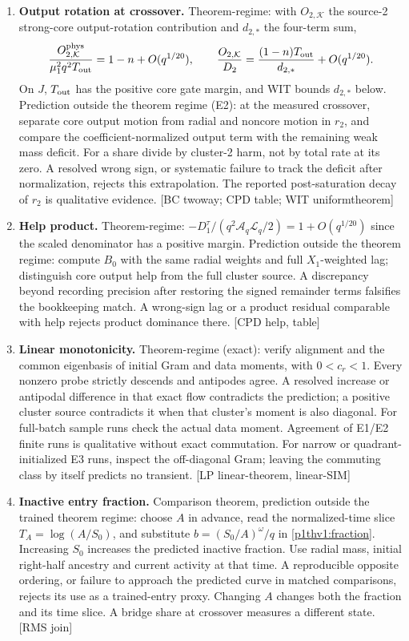 \documentclass[10pt,twocolumn]{article}
\newcommand{\src}[1]{\textnormal{\small [#1]}}
\begin{document}
\begin{enumerate}
\item \textbf{Output rotation at crossover.}
Theorem-regime: with \(O_{2,\mathcal K}\) the source-2 strong-core
output-rotation contribution and \(d_{2,*}\) the four-term sum,
\[
 \frac{O_{2,\mathcal K}^{\rm phys}}{\mu_1^2q^2T_{\rm out}}
       =1-n+O(q^{1/20}),\qquad
 \frac{O_{2,\mathcal K}}{D_2}
       =\frac{(1-n)T_{\rm out}}{d_{2,*}}+O(q^{1/20}).
\]
On \(J\), \(T_{\rm out}\) has the positive core gate margin, and WIT
bounds \(d_{2,*}\) below. Prediction outside the theorem regime (E2):
at the measured crossover, separate core output motion from radial
and noncore motion in \(r_2\), and compare the coefficient-normalized
output term with the remaining weak mass deficit. For a share divide
by cluster-2 harm, not by total rate at its zero. A resolved wrong
sign, or systematic failure to track the deficit after normalization,
rejects this extrapolation. The reported post-saturation decay of
\(r_2\) is qualitative evidence. \src{BC twoway; CPD table; WIT uniformtheorem}

\item \textbf{Help product.}
Theorem-regime: \(-D_1^\tau/(q^2\mathcal A_q\mathcal L_q/2)
=1+O(q^{1/20})\) since the scaled denominator has a positive margin.
Prediction outside the theorem regime: compute \(B_0\) with the
same radial weights and full \(X_1\)-weighted lag; distinguish
core output help from the full cluster source. A discrepancy beyond
recording precision after restoring the signed remainder terms
falsifies the bookkeeping match. A wrong-sign lag or a product
residual comparable with help rejects product dominance there.
\src{CPD help, table}

\item \textbf{Linear monotonicity.}
Theorem-regime (exact): verify alignment and the common eigenbasis
of initial Gram and data moments, with \(0<c_r<1\). Every nonzero
probe strictly descends and antipodes agree. A resolved increase or
antipodal difference in that exact flow contradicts the prediction;
a positive cluster source contradicts it when that cluster's moment
is also diagonal. For full-batch sample runs check the actual data
moment. Agreement of E1/E2 finite runs is qualitative without
exact commutation. For narrow or quadrant-initialized E3 runs,
inspect the off-diagonal Gram; leaving the commuting class by itself
predicts no transient. \src{LP linear-theorem, linear-SIM}

\item \textbf{Inactive entry fraction.}
Comparison theorem, prediction outside the trained theorem regime:
choose \(A\) in advance, read the normalized-time slice
\(T_A=\log(A/S_0)\), and substitute \(b=(S_0/A)^\omega/q\) in
\eqref{p1thv1:fraction}. Increasing \(S_0\) increases the predicted
inactive fraction. Use radial mass, initial right-half ancestry and
current activity at that time. A reproducible opposite ordering, or
failure to approach the predicted curve in matched comparisons,
rejects its use as a trained-entry proxy. Changing \(A\) changes
both the fraction and its time slice. A bridge share at crossover
measures a different state. \src{RMS join}


\end{enumerate}
\end{document}
